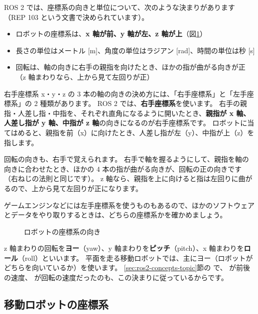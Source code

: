 ROS 2 では、座標系の向きと単位について、次のような決まりがあります（REP 103 という文書で決められています）。

\begin{itemize}
  \item ロボットの座標系は、\textbf{x 軸が前、y 軸が左、z 軸が上}（図\ref{fig:tf-viz-axes}）
  \item 長さの単位はメートル [m]、角度の単位はラジアン [rad]、時間の単位は秒 [s]
  \item 回転は、軸の向きに右手の親指を向けたとき、ほかの指が曲がる向きが正（z 軸まわりなら、上から見て左回りが正）
\end{itemize}

\begin{tips}{右手座標系}
  x・y・z の 3 本の軸の向きの決め方には、「右手座標系」と「左手座標系」の 2 種類があります。
  ROS 2 では、\textbf{右手座標系}を使います。
  右手の親指・人差し指・中指を、それぞれ直角になるように開いたとき、\textbf{親指が x 軸、人差し指が y 軸、中指が z 軸}の向きになるのが右手座標系です。
  ロボットに当てはめると、親指を前（x）に向けたとき、人差し指が左（y）、中指が上（z）を指します。

  回転の向きも、右手で覚えられます。
  右手で軸を握るようにして、親指を軸の向きに合わせたとき、ほかの 4 本の指が曲がる向きが、回転の正の向きです（右ねじの法則と同じです）。
  z 軸なら、親指を上に向けると指は左回りに曲がるので、上から見て左回りが正になります。

  ゲームエンジンなどには左手座標系を使うものもあるので、ほかのソフトウェアとデータをやり取りするときは、どちらの座標系かを確かめましょう。
\end{tips}

\begin{figure}[tb]
  \centering
  
  \caption{ロボットの座標系の向き}
  \label{fig:tf-viz-axes}
\end{figure}

z 軸まわりの回転を\textbf{ヨー}（yaw）、y 軸まわりを\textbf{ピッチ}（pitch）、x 軸まわりを\textbf{ロール}（roll）といいます。
平面を走る移動ロボットでは、主にヨー（ロボットがどちらを向いているか）を使います。
\ref{sec:ros2-concepts-topic}節の  で、 が前後の速度、 が回転の速度だったのも、この決まりに従っているからです。

\subsection{移動ロボットの座標系}

